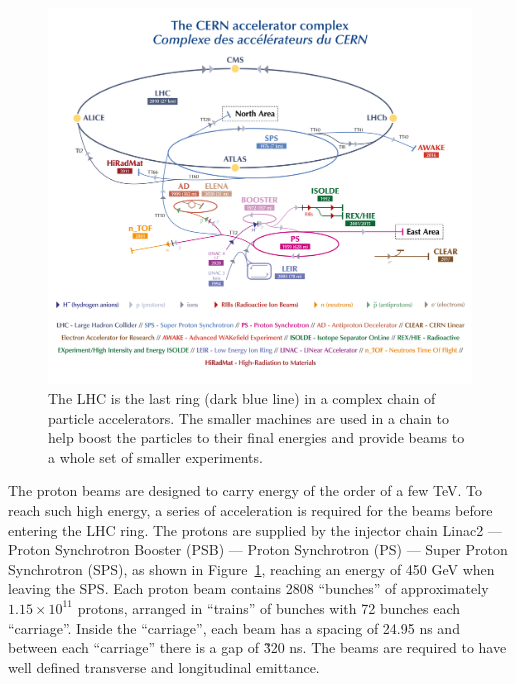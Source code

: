\documentclass[letterpaper,12pt]{article}
\begin{document}
	\begin{figure}[bht]
		\begin{centering}	
		\includegraphics[width=.75\textwidth]{Detector_plots/accelerator_complex_smaller.png}
		\caption{The LHC is the last ring (dark blue line) in a complex chain of 
		particle accelerators. The smaller machines are used in a chain to help boost 
		the particles to their final energies and provide beams to a whole set of smaller experiments.
			}
		\label{fig:accelerator_complex}
		\end{centering}
	\end{figure}
	The proton beams are designed to carry energy of the order of a few TeV.
	To reach such high energy, a series of acceleration is required for the beams before
	entering the LHC ring. The protons are supplied by the injector chain 
	Linac2 — Proton Synchrotron Booster (PSB) — Proton Synchrotron (PS) — Super Proton Synchrotron (SPS), 
	as shown in Figure~\ref{fig:accelerator_complex}, 
	reaching an energy of 450 GeV when leaving the SPS. 
	Each proton beam contains 2808 ``bunches'' of approximately 
	$1.15 \times 10^{11}$ protons, arranged in 
	``trains'' of bunches with 72 bunches each ``carriage''. 
	Inside the ``carriage'', each beam has a spacing of 24.95 ns and between each 
	``carriage'' there is a gap of \~ 320 ns. 
	The beams are required to have well defined transverse and longitudinal emittance. 
\end{document}
